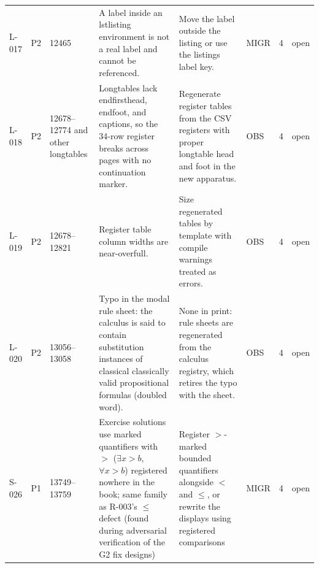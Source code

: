 \begin{longtable}{@{}p{0.45in}p{0.25in}p{0.7in}p{2.2in}p{1.75in}p{0.45in}p{0.16in}p{0.34in}@{}}
L-017 & P2 & 12465 & A label inside an lstlisting environment is not a real label and cannot be referenced. & Move the label outside the listing or use the listings label key. & MIGR & 4 & open \\
L-018 & P2 & 12678--12774 and other longtables & Longtables lack endfirsthead, endfoot, and captions, so the 34-row register breaks across pages with no continuation marker. & Regenerate register tables from the CSV registers with proper longtable head and foot in the new apparatus. & OBS & 4 & open \\
L-019 & P2 & 12678--12821 & Register table column widths are near-overfull. & Size regenerated tables by template with compile warnings treated as errors. & OBS & 4 & open \\
L-020 & P2 & 13056--13058 & Typo in the modal rule sheet: the calculus is said to contain substitution instances of classical classically valid propositional formulas (doubled word). & None in print: rule sheets are regenerated from the calculus registry, which retires the typo with the sheet. & OBS & 4 & open \\
S-026 & P1 & 13749--13759 & Exercise solutions use marked quantifiers with \(>\) (\(\exists x>b\), \(\forall x>b\)) registered nowhere in the book; same family as R-003's \(\le\) defect (found during adversarial verification of the G2 fix designs) & Register \(>\)-marked bounded quantifiers alongside \(<\) and \(\le\), or rewrite the displays using registered comparisons & MIGR & 4 & open \\
\end{longtable}
\endgroup
